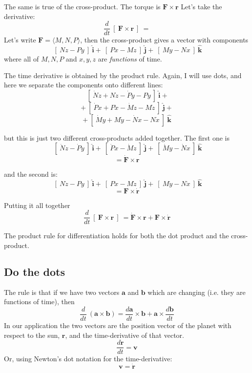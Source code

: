 \documentclass[11pt, oneside]{article}
\begin{document}
The same is true of the cross-product.  The torque is $\mathbf{F} \times \mathbf{r}$  Let's take the derivative:
\[ \frac{d}{dt} \ [ \ \mathbf{F} \times \mathbf{r} \ ] \ = \]
Let's write $\mathbf{F} = \langle M,N,P \rangle$, then the cross-product gives a vector with components
\[ \ [ \ N z - P y \ ] \ \mathbf{\hat{i}} + \ [ \ P x - M z \ ] \ \mathbf{\hat{j}} + \ [ \ M y - N x \ ] \ \mathbf{\hat{k}} \]
where all of $M,N,P$ and $x,y,z$ are \emph{functions} of time.

The time derivative is obtained by the product rule.  Again, I will use dots, and here we separate the components onto different lines:
\[ \ [ \ \dot{N} z + N \dot{z} - \dot{P} y - P \dot{y} \ ] \ \mathbf{\hat{i}} + \]
\[ + \  [ \ \dot{P} x + P \dot{x} - \dot{M} z - M \dot{z} \ ] \ \mathbf{\hat{j}} + \]
\[ +  \ [ \ \dot{M} y + M \dot{y} - \dot{N} x - N \dot{x} \ ] \ \mathbf{\hat{k}} \]

but this is just two different cross-products added together.  The first one is
\[ \ [ \ \dot{N} z - \dot{P} y \ ] \ \mathbf{\hat{i}} + \  [ \ \dot{P} x - \dot{M} z \ ] \ \mathbf{\hat{j}} +  \ [ \ \dot{M} y - \dot{N} x \ ] \ \mathbf{\hat{k}} \]
\[ = \mathbf{\dot{F}} \times \mathbf{r} \]

and the second is:
\[ \ [ \  N \dot{z}  - P \dot{y} \ ] \ \mathbf{\hat{i}} + \  [ \ P \dot{x} - M \dot{z} \ ] \ \mathbf{\hat{j}} +  \ [ \ M \dot{y} - N \dot{x} \ ] \ \mathbf{\hat{k}} \]
\[ = \mathbf{F} \times \mathbf{\dot{r}} \]

Putting it all together
\[ \frac{d}{dt} \ [ \ \mathbf{F} \times \mathbf{r} \ ] \ = \mathbf{\dot{F}} \times \mathbf{r} + \mathbf{F} \times \mathbf{\dot{r}} \]

The product rule for differentiation holds for both the dot product and the cross-product.

\subsection*{Do the dots}

The rule is that if we have two vectors $\mathbf{a}$ and $\mathbf{b}$ which are changing (i.e. they are functions of time), then
\[ \frac{d}{dt} \ (\mathbf{a} \times \mathbf{b}) = \frac{d\mathbf{a}}{dt} \times \mathbf{b} + \mathbf{a}  \times \frac{d\mathbf{b}}{dt}    \]
In our application the two vectors are the position vector of the planet with respect to the sun, $\mathbf{r}$, and the time-derivative of that vector.
\[ \frac{d\mathbf{r}}{dt} = \mathbf{v} \]
Or, using Newton's dot notation for the time-derivative:
\[ \mathbf{v} = \dot{\mathbf{r}} \]
\end{document}
